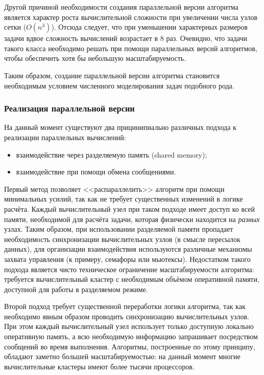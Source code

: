Другой причиной необходимости создания параллельной версии алгоритма является характер роста вычислительной сложности при увеличении числа узлов сетки ($O(n^3)$). Отсюда следует, что при уменьшении характерных размеров задачи вдвое сложность вычислений возрастает в 8 раз. Очевидно, что задачи такого класса необходимо решать при помощи параллельных версий алгоритмов, чтобы обеспечить хотя бы небольшую масштабируемость.

Таким образом, создание параллельной версии алгоритма становится необходимым условием численного моделирования задач подобного рода.

\subsubsection{Реализация параллельной версии}
На данный момент существуют два прицинипиально различных подхода к реализации параллельных вычислений:
\begin{itemize}
\item взаимодействие через разделяемую память (shared memory);
\item взаимодействие при помощи обмена сообщениями.
 \end{itemize}

Первый метод позволяет <<распараллелить>> алгоритм при помощи минимальных
усилий, так как не требует существенных изменений в логике расчёта. Каждый
вычислительный узел при таком подходе имеет доступ ко всей памяти, необходимой
для расчёта задачи, которая физически находится на \emph{разных} узлах. Таким
образом, при использовании разделяемой памяти пропадает необходимость
синхронизации вычислительных узлов (в смысле пересылок данных), для организации
взаимодействия используются различные механизмы захвата управления (к примеру,
семафоры или мьютексы). Недостатком такого подхода является чисто техническое
ограничение масштабируемости алгоритма: требуется вычислительный кластер с
необходимым объёмом оперативной памяти, доступной для работы в разделяемом
режиме.

Второй подход требует существенной переработки логики алгоритма, так как необходимо явным образом проводить синхронизацию вычислительных узлов. При этом каждый вычислительный узел использует только доступную локально оперативную память, а всю необходимую информацию запрашивает посредством сообщений во время выполнения. Алгоритмы, построенные по этому принципу, обладают заметно большей масштабируемостью: на данный момент многие вычислительные кластеры имеют более тысячи процессоров.

